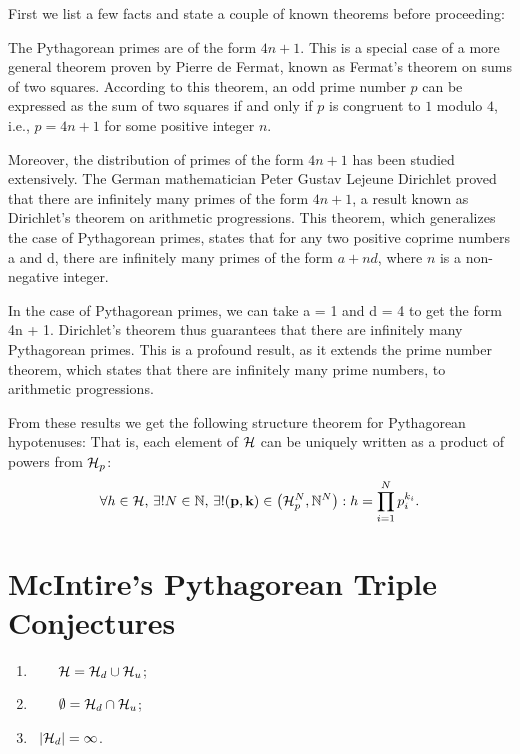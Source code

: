 \documentclass{article}
\theoremstyle{definition}
\begin{document}
First we list a few facts and state a couple of known theorems before proceeding:
\begin{enumerate}
  \item{The Pythagorean primes are of the form $4n + 1$. 
      This is a special case of a more general theorem proven by Pierre de Fermat, known as Fermat's theorem on sums of two squares. 
      According to this theorem, an odd prime number $p$ can be expressed as the sum of two squares if and only if 
      $p$ is congruent to $1$ modulo $4$, i.e., $p = 4n + 1$ for some positive integer $n$. 
    \item{Moreover, the distribution of primes of the form $4n + 1$ has been studied extensively.}
      The German mathematician Peter Gustav Lejeune Dirichlet proved that there are infinitely many primes of the form $4n + 1$, a result known as 
      Dirichlet's theorem on arithmetic progressions. 
      This theorem, which generalizes the case of Pythagorean primes, states that for any two positive coprime numbers a and d, 
      there are infinitely many primes of the form $a + nd$, where $n$ is a non-negative integer.} 
    \item{In the case of Pythagorean primes, we can take a = 1 and d = 4 to get the form 4n + 1. 
          Dirichlet's theorem thus guarantees that there are infinitely many Pythagorean primes. 
        This is a profound result, as it extends the prime number theorem, which states that there are infinitely many prime numbers, to arithmetic progressions.}
\end{enumerate}
From these results we get the following structure theorem for Pythagorean hypotenuses:
         That is, each element of ${\cal H}$ can be uniquely written as a product of powers from ${\cal H}_p$:
         \begin{eqnarray}
           \forall h \in {\cal H},\, \exists ! N \in \mathbb{N}, \, \exists ! ({\bf p},{\bf k}) \in \left({\cal H}_p^{N}, \mathbb{N}^{N}\right): h = \prod_{i=1}^N p_{i}^{k_i}.
         \end{eqnarray}


\section{McIntire's Pythagorean Triple Conjectures}

\begin{enumerate}
  \item{$\hphantom{|{\cal H}_d|}{\cal H} = {\cal H}_{d} \cup {\cal H}_u$;}
  \item{$\hphantom{|{\cal H}_d|}\emptyset = {\cal H}_{d} \cap {\cal H}_u$};
  \item{$\hphantom{\emptyset}|{\cal H}_d| = \infty$.}
\end{enumerate}
\end{document}
